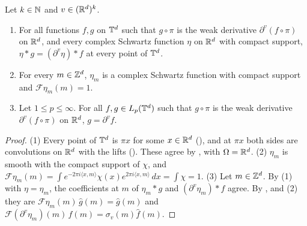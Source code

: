 \begin{lemma}
\label{lem:torus-weak-derivative-from-lift}
\leanok
{}
Let $k \in \mathbb{N}$ and $v \in (\mathbb{R}^d)^k$.
\begin{enumerate}
  \item For all functions $f, g$ on $\mathbb{T}^d$ such that $g \circ \pi$ is the weak derivative
    $\partial^v (f \circ \pi)$ on $\mathbb{R}^d$, and every complex Schwartz function $\eta$ on $\mathbb{R}^d$
    with compact support, $\eta * g = (\partial^v \eta) * f$ at every point of $\mathbb{T}^d$.
  \item For every $m \in \mathbb{Z}^d$, $\eta_m$ is a complex Schwartz function with compact support and
    $\mathcal{F}\eta_m(m) = 1$.
  \item Let $1 \leq p \leq \infty$. For all $f, g \in L_p(\mathbb{T}^d)$ such that $g \circ \pi$ is the
    weak derivative $\partial^v (f \circ \pi)$ on $\mathbb{R}^d$, $g = \partial^v f$.
\end{enumerate}
\end{lemma}

\begin{proof}
\leanok
(1) Every point of $\mathbb{T}^d$ is $\pi x$ for some $x \in \mathbb{R}^d$ (), and at $\pi x$
both sides are convolutions on $\mathbb{R}^d$ with the lifts (). These agree by
, with $\Omega = \mathbb{R}^d$. (2) $\eta_m$ is smooth with
the compact support of $\chi$, and
$\mathcal{F}\eta_m(m) = \int e^{-2\pi i \langle x, m \rangle} \chi(x)
e^{2\pi i \langle x, m \rangle} \, dx = \int \chi = 1$. (3) Let $m \in \mathbb{Z}^d$. By (1) with
$\eta = \eta_m$, the coefficients at $m$ of $\eta_m * g$ and $(\partial^v \eta_m) * f$ agree. By
,  and (2) they are
$\mathcal{F}\eta_m(m) \, \hat g(m) = \hat g(m)$ and
$\mathcal{F}(\partial^v \eta_m)(m) \, \hat f(m) = \sigma_v(m) \hat f(m)$.
\end{proof}

